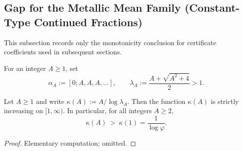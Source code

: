 \subsection{Gap for the Metallic Mean Family (Constant-Type Continued Fractions)}\label{app:kronecker-discrepancy-metallic-gap}

This subsection records only the monotonicity conclusion for certificate coefficients used in subsequent sections.

\begin{definition}\label{def:const-type}
For an integer $A\ge 1$, set
\[
\alpha_A:=[0;A,A,A,\dots],
\qquad
\lambda_A:=\frac{A+\sqrt{A^2+4}}{2}>1.
\]
\end{definition}

\begin{theorem}\label{thm:metallic-gap}
Let $A\ge 1$ and write \(\kappa(A):=A/\log\lambda_A\).
Then the function $\kappa(A)$ is strictly increasing on $[1,\infty)$. In particular, for all integers $A\ge 2$,
\[
\kappa(A)\ >\ \kappa(1)=\frac{1}{\log\varphi}.
\]
\end{theorem}

\begin{proof}
Elementary computation; omitted.
\end{proof}
